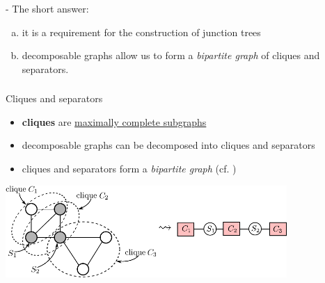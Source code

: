 \begin{frame}
	\slidesonly{\vspace{-5mm}}
	
	
	- The short answer:
	\begin{enumerate}[(a)]
	\item it is a requirement for the construction of junction trees 
	\item decomposable graphs allow us to form a \emph{bipartite graph} of cliques and separators.
	\end{enumerate}
	
\end{frame}

\newpage

\begin{frame} \frametitle{\secname}

	\begin{block}{Cliques and separators}
	\begin{itemize}
		\item \textbf{cliques} are \underline{maximally complete subgraphs}
		\item decomposable graphs can be decomposed into cliques and separators
		\item cliques and separators form a \emph{bipartite graph} (cf. )
	\end{itemize}
	\end{block}
	
	\slidesonly{\vspace{4mm}}
	
	{
	\centering
	\includegraphics[height=3.5cm]{img/section3_fig15}
	\label{fig:cliquessepformbipartite}
	}
	
		
\end{frame}


